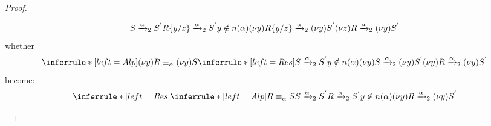 \begin{proof}
\begin{description}
\begin{itemize}
\begin{description}
\[{{{		      S\xrightarrow{\alpha}_{2}S^{'}
		  }{
		    R\{y/z\}\xrightarrow{\alpha}_{2}S^{'}
		  }
		\\
		  y\notin n(\alpha)
	      }{
		(\nu y) R\{y/z\} \xrightarrow{\alpha}_{2} (\nu y) S^{'}
	      }}{
		(\nu z) R \xrightarrow{\alpha}_{2} (\nu y) S^{'}
	      }
	    \]
	    whether
	    \[
	      \inferrule* [left=Alp]{
		  (\nu y)R\equiv_{\alpha}(\nu y)S
		\\
		  \inferrule* [left=Res]{
		      S\xrightarrow{\alpha}_{2}S^{'}
		    \\
		      y\notin n(\alpha)
		  }{
		    (\nu y) S \xrightarrow{\alpha}_{2} (\nu y) S^{'}
		  }
	      }{
		(\nu y) R \xrightarrow{\alpha}_{2} (\nu y) S^{'}
	      }
	    \]
	    become:
	    \[
	      \inferrule* [left=Res]{
		  \inferrule* [left=Alp]{
		      R\equiv_{\alpha}S
		    \\
		      S\xrightarrow{\alpha}_{2}S^{'}
		  }{
		    R\xrightarrow{\alpha}_{2}S^{'}
		  }
		\\
		  y\notin n(\alpha)
	      }{
		(\nu y) R \xrightarrow{\alpha}_{2} (\nu y) S^{'}
	      }
	    \]


\end{description}
\end{itemize}
\end{description}
\end{proof}
